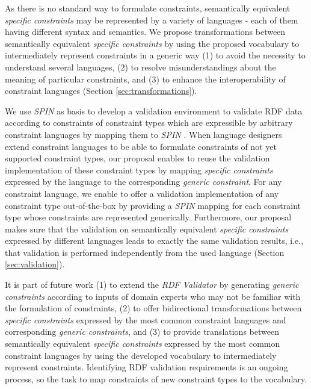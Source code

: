 \documentclass[a4paper,fontsize=11pt]{scrartcl}
\begin{document}
As there is no standard way to formulate constraints, 
semantically equivalent \emph{specific constraints} may be represented by a variety of languages - each of them having different syntax and semantics.
We propose transformations between semantically equivalent \emph{specific constraints}
by using the proposed vocabulary to intermediately represent constraints in a generic way
(1) to avoid the necessity to understand several languages,
(2) to resolve misunderstandings about the meaning of particular constraints, and
(3) to enhance the interoperability of constraint languages (Section \ref{sec:transformations}).

We use \emph{SPIN} as basis to develop a validation environment to validate RDF data according to constraints of constraint types which are expressible by arbitrary constraint languages by mapping them to \emph{SPIN} \cite{BoschEckert2014-2}.
When language designers extend constraint languages 
to be able to formulate constraints of not yet supported constraint types,
our proposal enables to reuse the validation implementation of these constraint types 
by mapping \emph{specific constraints} expressed by the language to the corresponding \emph{generic constraint}.
For any constraint language, we enable to offer a validation implementation of any constraint type out-of-the-box
by providing a \emph{SPIN} mapping
for each constraint type  
whose constraints are represented generically. 
Furthermore, our proposal makes sure that the validation on semantically equivalent \emph{specific constraints} expressed by different languages
leads to exactly the same validation results, 
i.e., that validation is performed independently from the used language (Section \ref{sec:validation}).

It is part of future work 
(1) to extend the \emph{RDF Validator} by generating \emph{generic constraints} according to inputs of domain experts who may not be familiar with the formulation of constraints,
(2) to offer bidirectional transformations between \emph{specific constraints} expressed by the most common constraint languages and corresponding \emph{generic constraints}, and
(3) to provide translations between semantically equivalent \emph{specific constraints} expressed by the most common constraint languages by using the developed vocabulary to intermediately represent constraints.
Identifying RDF validation requirements is an ongoing process,
so the task to map constraints of new constraint types to the vocabulary.
\end{document}
